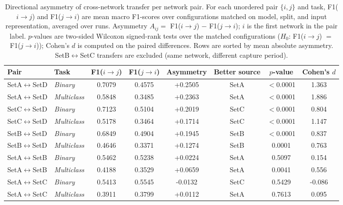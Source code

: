 \begin{table}[htbp]
\caption{Directional asymmetry of cross-network transfer per network pair. For each unordered pair $\{i, j\}$ and task, F1($i \to j$) and F1($j \to i$) are mean macro F1-scores over configurations matched on model, split, and input representation, averaged over runs. Asymmetry $A_{ij} = $ F1($i \to j$) $-$ F1($j \to i$); $i$ is the first network in the pair label. $p$-values are two-sided Wilcoxon signed-rank tests over the matched configurations ($H_0$: F1($i \to j$) $=$ F1($j \to i$)); Cohen's $d$ is computed on the paired differences. Rows are sorted by mean absolute asymmetry. SetB$\leftrightarrow$SetC transfers are excluded (same network, different capture period).}
\label{tab:q4_pairs}
\centering
\begin{tabular}{llcccccc}
\toprule
Pair & Task & F1($i \to j$) & F1($j \to i$) & Asymmetry & Better source & $p$-value & Cohen's $d$ \\
\midrule
SetA$\leftrightarrow$SetD & \textit{Binary} & 0.7079 & 0.4575 & +0.2505 & SetA & $<$0.0001 & 1.363 \\
SetA$\leftrightarrow$SetD & \textit{Multiclass} & 0.5848 & 0.3485 & +0.2363 & SetA & $<$0.0001 & 1.886 \\
\addlinespace
SetC$\leftrightarrow$SetD & \textit{Binary} & 0.7123 & 0.5104 & +0.2019 & SetC & $<$0.0001 & 0.804 \\
SetC$\leftrightarrow$SetD & \textit{Multiclass} & 0.5178 & 0.3464 & +0.1714 & SetC & $<$0.0001 & 1.147 \\
\addlinespace
SetB$\leftrightarrow$SetD & \textit{Binary} & 0.6849 & 0.4904 & +0.1945 & SetB & $<$0.0001 & 0.837 \\
SetB$\leftrightarrow$SetD & \textit{Multiclass} & 0.4646 & 0.3371 & +0.1274 & SetB & 0.0001 & 0.763 \\
\addlinespace
SetA$\leftrightarrow$SetB & \textit{Binary} & 0.5462 & 0.5238 & +0.0224 & SetA & 0.5097 & 0.154 \\
SetA$\leftrightarrow$SetB & \textit{Multiclass} & 0.4188 & 0.3529 & +0.0659 & SetA & 0.0041 & 0.556 \\
\addlinespace
SetA$\leftrightarrow$SetC & \textit{Binary} & 0.5413 & 0.5545 & -0.0132 & SetC & 0.5429 & -0.086 \\
SetA$\leftrightarrow$SetC & \textit{Multiclass} & 0.3911 & 0.3799 & +0.0112 & SetA & 0.7613 & 0.095 \\
\bottomrule
\end{tabular}
\end{table}